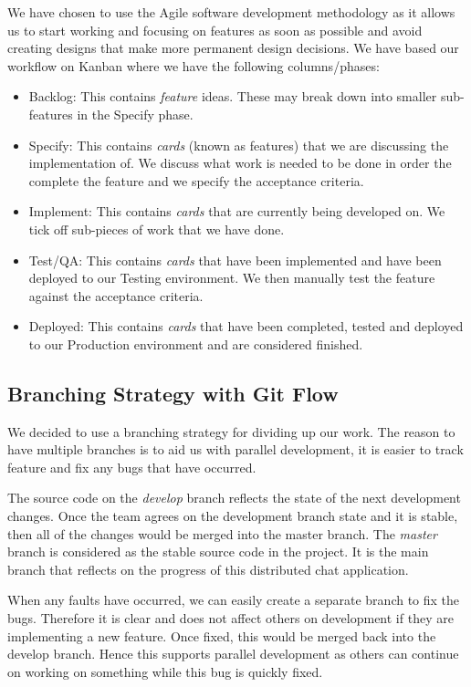 \documentclass[11pt,a4paper]{report}
\begin{document}
We have chosen to use the Agile software development methodology as it allows us to start working and focusing on features as soon as possible and avoid creating designs that make more permanent design decisions. We have based our workflow on Kanban where we have the following columns/phases:
\begin{itemize}
  \item Backlog: This contains \emph{feature} ideas. These may break down into smaller sub-features in the Specify phase.
  \item Specify: This contains \emph{cards} (known as features) that we are discussing the implementation of. We discuss what work is needed to be done in order the complete the feature and we specify the acceptance criteria.
  \item Implement: This contains \emph{cards} that are currently being developed on. We tick off sub-pieces of work that we have done.
  \item Test/QA: This contains \emph{cards} that have been implemented and have been deployed to our Testing environment. We then manually test the feature against the acceptance criteria.
  \item Deployed: This contains \emph{cards} that have been completed, tested and deployed to our Production environment and are considered finished.
\end{itemize}

\subsection{Branching Strategy with Git Flow}
We decided to use a branching strategy for dividing up our work. The reason to have multiple branches is to aid us with parallel development, it is easier to track feature and fix any bugs that have occurred.

The source code on the \emph{develop} branch reflects the state of the next development changes. Once the team agrees on the development branch state and it is stable, then all of the changes would be merged into the master branch.
The \emph{master} branch is considered as the stable source code in the project. It is the main branch that reflects on the progress of this distributed chat application.

When any faults have occurred, we can easily create a separate branch to fix the bugs. Therefore it is clear and does not affect others on development if they are implementing a new feature. Once fixed, this would be merged back into the develop branch. Hence this supports parallel development as others can continue on working on something while this bug is quickly fixed.
\end{document}

